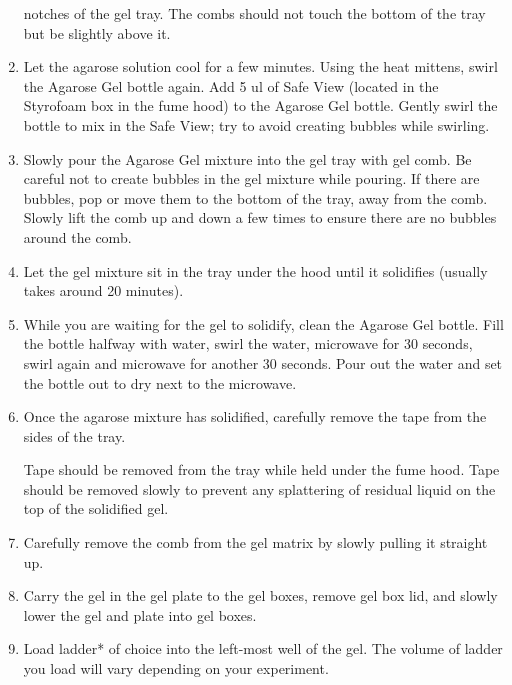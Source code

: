 \documentclass[
  letterpaper,
  DIV=11,
  numbers=noendperiod]{scrreprt}
\begin{document}
\begin{enumerate}
  notches of the gel tray. The combs should not touch the bottom of the
  tray but be slightly above it.
\item
  Let the agarose solution cool for a few minutes. Using the heat
  mittens, swirl the Agarose Gel bottle again. Add 5 ul of Safe View
  (located in the Styrofoam box in the fume hood) to the Agarose Gel
  bottle. Gently swirl the bottle to mix in the Safe View; try to avoid
  creating bubbles while swirling.
\item
  Slowly pour the Agarose Gel mixture into the gel tray with gel comb.
  Be careful not to create bubbles in the gel mixture while pouring. If
  there are bubbles, pop or move them to the bottom of the tray, away
  from the comb. Slowly lift the comb up and down a few times to ensure
  there are no bubbles around the comb.
\item
  Let the gel mixture sit in the tray under the hood until it solidifies
  (usually takes around 20 minutes).
\item
  While you are waiting for the gel to solidify, clean the Agarose Gel
  bottle. Fill the bottle halfway with water, swirl the water, microwave
  for 30 seconds, swirl again and microwave for another 30 seconds. Pour
  out the water and set the bottle out to dry next to the microwave.
\item
  Once the agarose mixture has solidified, carefully remove the tape
  from the sides of the tray.

  \begin{tcolorbox}[enhanced jigsaw, bottomtitle=1mm, rightrule=.15mm, toptitle=1mm, opacitybacktitle=0.6, bottomrule=.15mm, titlerule=0mm, coltitle=black, leftrule=.75mm, arc=.35mm, colback=white, colframe=quarto-callout-important-color-frame, left=2mm, colbacktitle=quarto-callout-important-color!10!white, title=\textcolor{quarto-callout-important-color}{\faExclamation}\hspace{0.5em}{This is important}, toprule=.15mm, opacityback=0, breakable]

  Tape should be removed from the tray while held under the fume hood.
  Tape should be removed slowly to prevent any splattering of residual
  liquid on the top of the solidified gel.

  \end{tcolorbox}
\item
  Carefully remove the comb from the gel matrix by slowly pulling it
  straight up.
\item
  Carry the gel in the gel plate to the gel boxes, remove gel box lid,
  and slowly lower the gel and plate into gel boxes.
\item
  Load ladder* of choice into the left-most well of the gel. The volume
  of ladder you load will vary depending on your experiment.


\end{enumerate}
\end{document}
